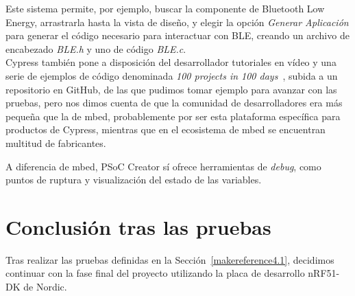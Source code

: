 Este sistema permite, por ejemplo, buscar la componente de Bluetooth Low Energy, arrastrarla hasta la vista de diseño, y elegir la opción \textit{Generar Aplicación} para generar el código necesario para interactuar con BLE, creando un archivo de encabezado \textit{BLE.h} y uno de código \textit{BLE.c}.\\

Cypress también pone a disposición del desarrollador tutoriales en vídeo y una serie de ejemplos de código denominada \textit{100 projects in 100 days}~\cite{100Projects}, subida a un repositorio en GitHub, de las que pudimos tomar ejemplo para avanzar con las pruebas, pero nos dimos cuenta de que la comunidad de desarrolladores era más pequeña que la de mbed, probablemente por ser esta plataforma específica para productos de Cypress, mientras que en el ecosistema de mbed se encuentran multitud de fabricantes. 

A diferencia de mbed, PSoC Creator sí ofrece herramientas de \textit{debug}, como puntos de ruptura y visualización del estado de las variables.

\section{Conclusión tras las pruebas}
\label{makereference4.3}

Tras realizar las pruebas definidas en la Sección~\ref{makereference4.1}, decidimos continuar con la fase final del proyecto utilizando la placa de desarrollo nRF51-DK de Nordic.